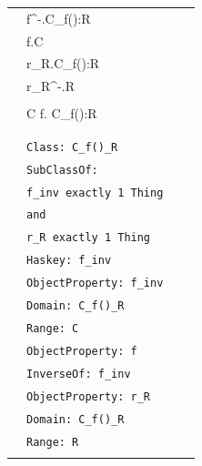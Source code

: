 \begin{longtable}{|>{\scriptsize}c|>{\scriptsize}l|>{\scriptsize}l|>{\scriptsize}p{0.8cm}|}
\begin{minipage}{\dltablespacing}
\begin{aligned}
	&\exists f^-.\top \sqsubseteq C_{f():R}\\
	&\exists f.\top \sqsubseteq C \\
	&\exists r_R.\top \sqsubseteq C_{f():R}\\
	&\exists r_R^-.\top \sqsubseteq R\\
	\\
	&C \sqsubseteq \exists f. C_{f():R}\\
	\\
       \end{aligned}$      
       Note that determinism of the return value cannot be enforced since rule-like constructs are required which are not supported in $\mathcal{SROIQ}^{(\mathcal{D})}$\\
    \end{minipage}
    &
     $\begin{aligned}
     \\
  	&\texttt{Class: C\_f()\_R} \\[\owlspacing]
  	&\texttt{\hspace*{2mm}SubClassOf:}\\[\owlspacing]
  	&\texttt{\hspace*{4mm}f\_inv exactly 1 Thing}\\[\owlspacing]
  	&\texttt{\hspace*{4mm}and}\\[\owlspacing]
  	&\texttt{\hspace*{4mm}r\_R exactly 1 Thing}\\[\owlspacing]
  	&\texttt{\hspace*{2mm}Haskey: f\_inv} \\
  	 &\texttt{ObjectProperty: f\_inv}\\[\owlspacing]
         &\texttt{\hspace*{2mm}Domain: C\_f()\_R}\\[\owlspacing]
         &\texttt{\hspace*{2mm}Range: C}\\[\owlspacing]
         &\texttt{ObjectProperty: f}\\[\owlspacing]
         &\texttt{\hspace*{2mm}InverseOf: f\_inv}\\[\owlspacing]
         &\texttt{ObjectProperty: r\_R}\\[\owlspacing]
         &\texttt{\hspace*{2mm}Domain: C\_f()\_R}\\[\owlspacing]
         &\texttt{\hspace*{2mm}Range: R}\\

\end{aligned}
\end{longtable}
